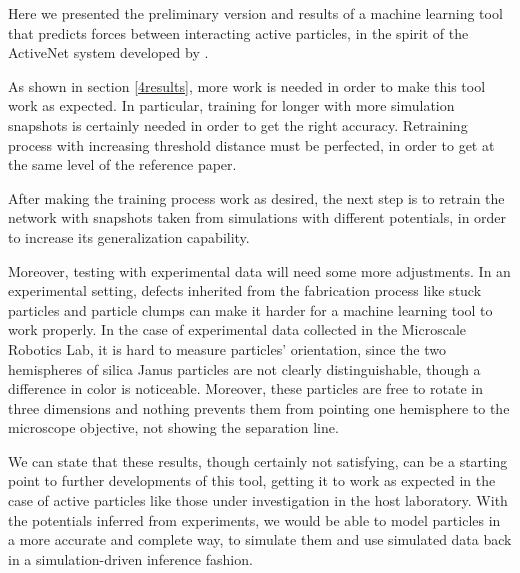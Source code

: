 \documentclass[../../master_thesis_np.tex]{subfiles}
\begin{document}
Here we presented the preliminary version and results of a machine learning tool that predicts forces between interacting active particles, in the spirit of the ActiveNet system developed by \citeauthor{ruiz-garcia_discovering_2024}.

As shown in section \ref{4results}, more work is needed in order to make this tool work as expected.
In particular, training for longer with more simulation snapshots is certainly needed in order to get the right accuracy.
Retraining process with increasing threshold distance must be perfected, in order to get at the same level of the reference paper.

After making the training process work as desired, the next step is to retrain the network with snapshots taken from simulations with different potentials, in order to increase its generalization capability.

Moreover, testing with experimental data will need some more adjustments.
In an experimental setting, defects inherited from the fabrication process like stuck particles and particle clumps can make it harder for a machine learning tool to work properly.
In the case of experimental data collected in the Microscale Robotics Lab, it is hard to measure particles' orientation, since the two hemispheres of silica Janus particles are not clearly distinguishable, though a difference in color is noticeable.
Moreover, these particles are free to rotate in three dimensions and nothing prevents them from pointing one hemisphere to the microscope objective, not showing the separation line.

We can state that these results, though certainly not satisfying, can be a starting point to further developments of this tool, getting it to work as expected in the case of active particles like those under investigation in the host laboratory.
With the potentials inferred from experiments, we would be able to model particles in a more accurate and complete way, to simulate them and use simulated data back in a simulation-driven inference fashion.
\end{document}
